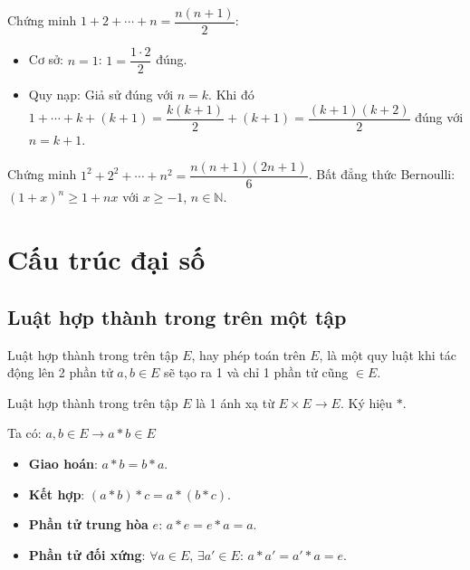 \documentclass[12pt,a4paper]{article}
\begin{document}
\begin{vidu}
  Chứng minh $1 + 2 + \cdots + n = \dfrac{n(n+1)}{2}$:
  \begin{itemize}
    \item Cơ sở: $n=1$: $1 = \dfrac{1 \cdot 2}{2}$ đúng.
    \item Quy nạp: Giả sử đúng với $n=k$. Khi đó $1 + \cdots + k + (k+1) = \dfrac{k(k+1)}{2} + (k+1) = \dfrac{(k+1)(k+2)}{2}$ đúng với $n=k+1$.
  \end{itemize}
\end{vidu}

\begin{vidu}
  Chứng minh $1^2 + 2^2 + \cdots + n^2 = \dfrac{n(n+1)(2n+1)}{6}$. Bất đẳng thức Bernoulli: $(1+x)^n \ge 1 + nx$ với $x \ge -1$, $n \in \mathbb{N}$.
\end{vidu}

\section{Cấu trúc đại số}

\subsection{Luật hợp thành trong trên một tập}

\begin{dinhnghia}
    Luật hợp thành trong trên tập $E$, hay phép toán trên $E$, là một quy luật khi tác động lên 2 phần tử $a, b \in E$ sẽ tạo ra 1 và chỉ 1 phần tử cũng $\in E$.

    Luật hợp thành trong trên tập $E$ là 1 ánh xạ từ $E \times E \to E$. Ký hiệu $*$.

    Ta có: $a, b \in E \to a * b \in E$
\end{dinhnghia}

\begin{tinhchat}[title={Tính chất của luật hợp thành trong}]
  \begin{itemize}
    \item \textbf{Giao hoán}: $a * b = b * a$.
    \item \textbf{Kết hợp}: $(a * b) * c = a * (b * c)$.
    \item \textbf{Phần tử trung hòa} $e$: $a * e = e * a = a$.
    \item \textbf{Phần tử đối xứng}: $\forall a \in E$, $\exists a' \in E$: $a * a' = a' * a = e$.
  \end{itemize}
\end{tinhchat}
\end{document}

